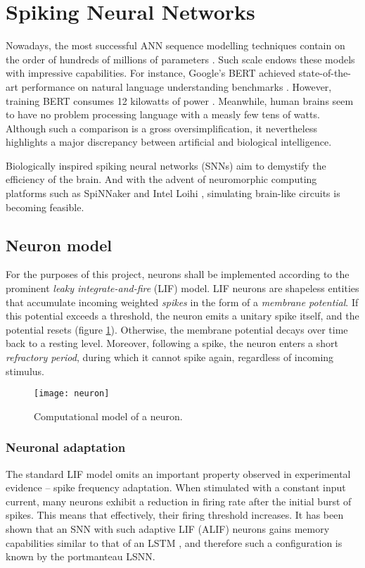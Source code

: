 \documentclass[../../report.tex]{subfiles}
\begin{document}
\section{Spiking Neural Networks}

Nowadays, the most successful ANN sequence modelling techniques contain on the
order of hundreds of millions of parameters \cite{Bender2021}. Such scale endows
these models with impressive capabilities. For instance, Google's BERT achieved
state-of-the-art performance on natural language understanding benchmarks
\cite{Devlin2019}. However, training BERT consumes 12 kilowatts of power
\cite{Strubell2019}. Meanwhile, human brains seem to have no problem processing
language with a measly few tens of watts. Although such a comparison is a gross
oversimplification, it nevertheless highlights a major discrepancy between
artificial and biological intelligence.

Biologically inspired spiking neural networks (SNNs) aim to demystify the
efficiency of the brain. And with the advent of neuromorphic computing platforms
such as SpiNNaker \cite{Furber2014} and Intel Loihi \cite{Davies2018},
simulating brain-like circuits is becoming feasible.

\subsection{Neuron model}

For the purposes of this project, neurons shall be implemented according to the
prominent \emph{leaky integrate-and-fire} (LIF) model. LIF neurons are shapeless
entities that accumulate incoming weighted \emph{spikes} in the form of a
\emph{membrane potential}. If this potential exceeds a threshold, the neuron
emits a unitary spike itself, and the potential resets (figure
\ref{fig:neuron}). Otherwise, the membrane potential decays over time back to a
resting level. Moreover, following a spike, the neuron enters a short
\emph{refractory period}, during which it cannot spike again, regardless of
incoming stimulus.

\begin{figure}
  \centering
  \texttt{[image: neuron]}
  \caption{Computational model of a neuron. \cite{Lobo2020}}
  \label{fig:neuron}
\end{figure}

\subsubsection{Neuronal adaptation}
The standard LIF model omits an important property observed in experimental
evidence -- spike frequency adaptation. When stimulated with a constant input
current, many neurons exhibit a reduction in firing rate after the initial burst
of spikes. This means that effectively, their firing threshold increases. It has
been shown that an SNN with such adaptive LIF (ALIF) neurons gains memory
capabilities similar to that of an LSTM \cite{Bellec2018LSNN}, and therefore
such a configuration is known by the portmanteau LSNN.
\end{document}
